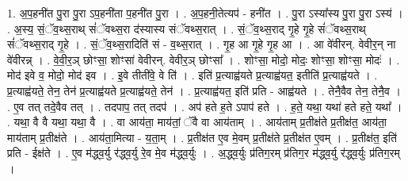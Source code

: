 \documentclass[17pt]{extarticle}
\begin{document}
1. अ॒प॒हनी॑त पु॒रा पु॒रा ऽप॒हनी॑ता प॒हनी॑त पु॒रा । . अ॒प॒हनी॒तेत्यप॑ - हनी॑त । . पु॒रा ऽस्या᳚स्य पु॒रा पु॒रा ऽस्य॑ । . अ॒स्य॒ सं॒ॅव॒थ्स॒राथ् सं॑ॅवथ्स॒रा द॑स्यास्य संॅवथ्स॒रात् । . सं॒ॅव॒थ्स॒राद् गृ॒हे गृ॒हे सं॑ॅवथ्स॒राथ् सं॑ॅवथ्स॒राद् गृ॒हे । . सं॒ॅव॒थ्स॒रादिति॑ सं - व॒थ्स॒रात् । . गृ॒ह आ गृ॒हे गृ॒ह आ । . आ वे॑वीरन्. वेवीर॒न् ना वे॑वीरन्न् । . वे॒वी॒र॒ञ् छोꣳसा॒ शोꣳसा॑ वेवीरन्. वेवीर॒ञ् छोꣳसा᳚ । . शोꣳसा॒ मोदो॒ मोदः॒ शोꣳसा॒ शोꣳसा॒ मोदः॑ । . मोद॑ इवे व॒ मोदो॒ मोद॑ इव । . इ॒वे तीती॑वे॒ वे ति॑ । . इति॑ प्र॒त्याह्व॑यते प्र॒त्याह्व॑यत॒ इतीति॑ प्र॒त्याह्व॑यते । . प्र॒त्याह्व॑यते॒ तेन॒ तेन॑ प्र॒त्याह्व॑यते प्र॒त्याह्व॑यते॒ तेन॑ । . प्र॒त्याह्व॑यत॒ इति॑ प्रति - आह्व॑यते । . तेनै॒वैव तेन॒ तेनै॒व । . ए॒व तत् तदे॒वैव तत् । . तदपाप॒ तत् तदप॑ । . अप॑ हते ह॒ते ऽपाप॑ हते । . ह॒ते॒ यथा॒ यथा॑ हते हते॒ यथा᳚ । . यथा॒ वै वै यथा॒ यथा॒ वै । . वा आय॑ता॒ माय॑तां॒ ॅवै वा आय॑ताम् । . आय॑ताम् प्र॒तीक्ष॑ते प्र॒तीक्ष॑त॒ आय॑ता॒ माय॑ताम् प्र॒तीक्ष॑ते । . आय॑ता॒मित्या - य॒ता॒म् । . प्र॒तीक्ष॑त ए॒व मे॒वम् प्र॒तीक्ष॑ते प्र॒तीक्ष॑त ए॒वम् । . प्र॒तीक्ष॑त॒ इति॑ प्रति - ईक्ष॑ते । . ए॒व म॑द्ध्व॒र्यु र॑द्ध्व॒र्यु रे॒व मे॒व म॑द्ध्व॒र्युः । . अ॒द्ध्व॒र्युः प्र॑तिग॒रम् प्र॑तिग॒र म॑द्ध्व॒र्यु र॑द्ध्व॒र्युः प्र॑तिग॒रम् । \newline
\end{document}
